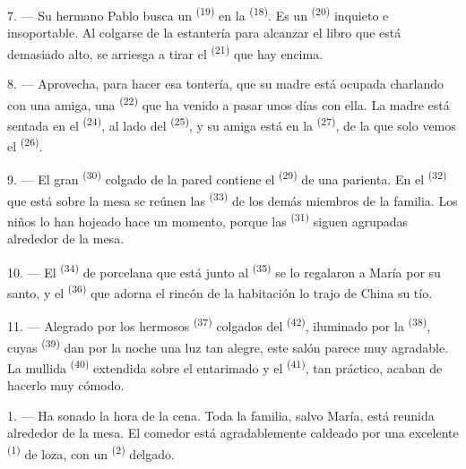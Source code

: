 \VUsaut{5.0mm}
\VUsaut{3.0mm}

7. --- Su hermano Pablo busca un  \textsuperscript{(19)} en la
 \textsuperscript{(18)}. Es un  \textsuperscript{(20)}
inquieto e insoportable. Al colgarse de la estantería para alcanzar el
libro que está demasiado alto, se arriesga a tirar el 
\textsuperscript{(21)} que hay encima.

8. --- Aprovecha, para hacer esa tontería, que su madre está ocupada
charlando con una amiga, una  \textsuperscript{(22)} que ha venido a
pasar unos días con ella. La madre está sentada en el 
\textsuperscript{(24)}, al lado del  \textsuperscript{(25)}, y su amiga está
en la  \textsuperscript{(27)}, de la que solo vemos el
 \textsuperscript{(26)}.

9. --- El gran  \textsuperscript{(30)} colgado de la pared contiene el
 \textsuperscript{(29)} de una parienta. En el 
\textsuperscript{(32)} que está sobre la mesa se reúnen las 
\textsuperscript{(33)} de los demás miembros de la familia. Los niños lo han
hojeado hace un momento, porque las  \textsuperscript{(31)} siguen
agrupadas alrededor de la mesa.

10. --- El  \textsuperscript{(34)} de porcelana que está junto
al  \textsuperscript{(35)} se lo regalaron a María por su santo,
y el  \textsuperscript{(36)} que adorna el rincón de la habitación lo
trajo de China su tío.

11. --- Alegrado por los hermosos  \textsuperscript{(37)} colgados
del  \textsuperscript{(42)}, iluminado por la  \textsuperscript{(38)}, cuyas  \textsuperscript{(39)} dan por la
noche una luz tan alegre, este salón parece muy agradable. La mullida
 \textsuperscript{(40)} extendida sobre el entarimado y el
 \textsuperscript{(41)}, tan práctico, acaban de hacerlo
muy cómodo.

\VUsaut{3.6mm}
\VUsaut{3.0mm}

1. --- Ha sonado la hora de la cena. Toda la familia, salvo María, está
reunida alrededor de la mesa. El comedor está agradablemente caldeado por
una excelente  \textsuperscript{(1)} de loza, con un 
\textsuperscript{(2)} delgado.

